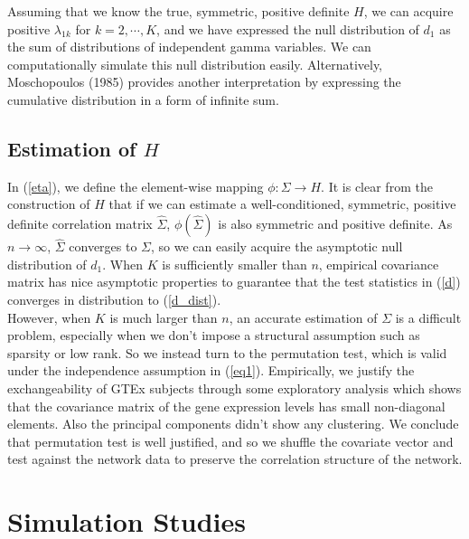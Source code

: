 \documentclass[12pt]{extarticle}
\theoremstyle{theorem}
\begin{document}
\vspace{5mm} \noindent 
Assuming that we know the true, symmetric, positive definite $H$, we can acquire positive $\lambda_{1k}$ for $k = 2, \cdots, K$, and we have expressed the null distribution of $d_1$ as the sum of distributions of independent gamma variables. We can computationally simulate this null distribution easily. Alternatively, Moschopoulos (1985) \cite{moschopoulos1985distribution} provides another interpretation by expressing the cumulative distribution in a form of infinite sum. 

\subsection{Estimation of $H$}
In (\ref{eta}), we define the element-wise mapping $\phi: \Sigma \rightarrow H$. It is clear from the construction of $H$ that if we can estimate a well-conditioned, symmetric, positive definite correlation matrix $\hat{\Sigma}$, $\phi(\hat{\Sigma})$ is also symmetric and positive definite. As $n \rightarrow \infty$, $\hat{\Sigma}$ converges to $\Sigma$, so we can easily acquire the asymptotic null distribution of $d_1$. When $K$ is sufficiently smaller than $n$, empirical covariance matrix has nice asymptotic properties to guarantee that the test statistics in (\ref{d}) converges in distribution to (\ref{d_dist}).\\

\noindent However, when $K$ is much larger than $n$, an accurate estimation of $\Sigma$ is a difficult problem, especially when we don't impose a structural assumption such as sparsity or low rank. So we instead turn to the permutation test, which is valid under the independence assumption in (\ref{eq1}). Empirically, we justify the exchangeability of GTEx subjects through some exploratory analysis which shows that the covariance matrix of the gene expression levels has small non-diagonal elements. Also the principal components didn't show any clustering. We conclude that permutation test is well justified, and so we shuffle the covariate vector and test against the network data to preserve the correlation structure of the network. 

\section{Simulation Studies}
\end{document}
